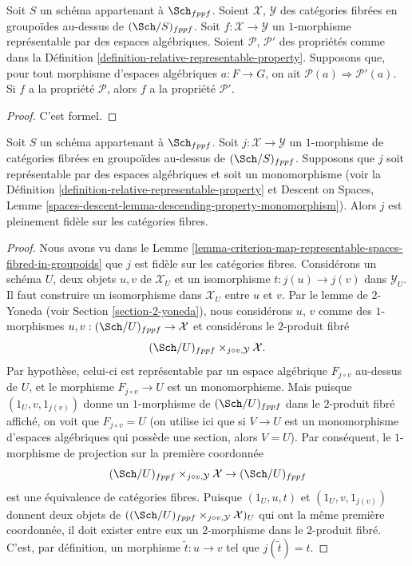 \begin{lemma}
\label{lemma-representable-transformations-property-implication}
Soit $S$ un schéma appartenant à $\Sch_{fppf}$.
Soient $\mathcal{X}$, $\mathcal{Y}$ des catégories fibrées en groupoïdes
au-dessus de $(\Sch/S)_{fppf}$.
Soit $f : \mathcal{X} \to \mathcal{Y}$ un $1$-morphisme représentable
par des espaces algébriques.
Soient $\mathcal{P}$, $\mathcal{P}'$ des propriétés comme dans la
Définition \ref{definition-relative-representable-property}.
Supposons que, pour tout morphisme d'espaces algébriques $a : F \to G$,
on ait $\mathcal{P}(a) \Rightarrow \mathcal{P}'(a)$.
Si $f$ a la propriété $\mathcal{P}$, alors
$f$ a la propriété $\mathcal{P}'$.
\end{lemma}

\begin{proof}
C'est formel.
\end{proof}

\begin{lemma}
\label{lemma-open-fibred-category-is-full}
Soit $S$ un schéma appartenant à $\Sch_{fppf}$.
Soit $j : \mathcal X \to \mathcal Y$ un $1$-morphisme de
catégories fibrées en groupoïdes au-dessus de $(\Sch/S)_{fppf}$.
Supposons que $j$ soit représentable par des espaces algébriques et soit un monomorphisme
(voir la
Définition \ref{definition-relative-representable-property}
et
Descent on Spaces, Lemme
\ref{spaces-descent-lemma-descending-property-monomorphism}).
Alors $j$ est pleinement fidèle sur les catégories fibres.
\end{lemma}

\begin{proof}
Nous avons vu dans le
Lemme \ref{lemma-criterion-map-representable-spaces-fibred-in-groupoids}
que $j$ est fidèle sur les catégories fibres. Considérons un schéma $U$,
deux objets $u, v$ de $\mathcal{X}_U$ et un isomorphisme
$t : j(u) \to j(v)$ dans $\mathcal{Y}_U$. Il faut construire un
isomorphisme dans $\mathcal{X}_U$ entre $u$ et $v$.
Par le lemme de $2$-Yoneda (voir Section \ref{section-2-yoneda}),
nous considérons $u$, $v$ comme des $1$-morphismes
$u, v : (\Sch/U)_{fppf} \to \mathcal{X}$
et considérons le $2$-produit fibré
$$
(\Sch/U)_{fppf} \times_{j \circ v, \mathcal{Y}} \mathcal{X}.
$$
Par hypothèse, celui-ci est représentable par un espace algébrique
$F_{j \circ v}$ au-dessus de $U$, et le morphisme
$F_{j \circ v} \to U$ est un monomorphisme.
Mais puisque $(1_U, v, 1_{j(v)})$ donne un $1$-morphisme de
$(\Sch/U)_{fppf}$ dans le $2$-produit fibré affiché,
on voit que $F_{j \circ v} = U$ (on utilise ici
que si $V \to U$ est un monomorphisme d'espaces algébriques qui possède une
section, alors $V = U$). Par conséquent, le $1$-morphisme de projection sur
la première coordonnée
$$
(\Sch/U)_{fppf} \times_{j \circ v, \mathcal{Y}} \mathcal{X}
\to (\Sch/U)_{fppf}
$$
est une équivalence de catégories fibres.
Puisque $(1_U, u, t)$ et $(1_U, v, 1_{j(v)})$ donnent deux
objets de $((\Sch/U)_{fppf} \times_{j \circ v, \mathcal{Y}}
\mathcal{X})_U$ qui ont la même première coordonnée, il doit
exister entre eux un $2$-morphisme dans le $2$-produit fibré.
C'est, par définition, un morphisme $\tilde t : u \to v$ tel que
$j(\tilde t) = t$.
\end{proof}


